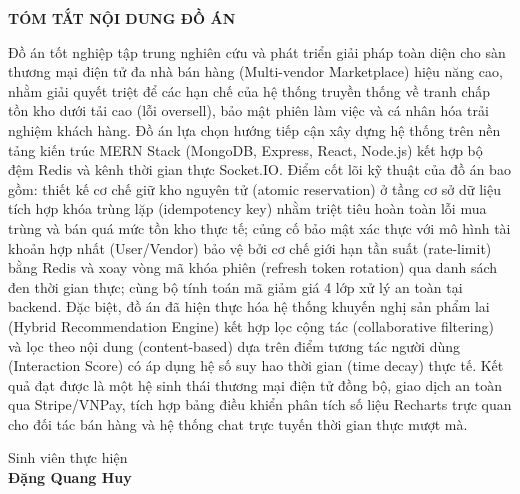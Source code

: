 \documentclass[../DoAn.tex]{subfiles}
\begin{document}
\begin{center}
    \Large{\textbf{TÓM TẮT NỘI DUNG ĐỒ ÁN}}\\
\end{center}
\vspace{1cm}

Đồ án tốt nghiệp tập trung nghiên cứu và phát triển giải pháp toàn diện cho sàn thương mại điện tử đa nhà bán hàng (Multi-vendor Marketplace) hiệu năng cao, nhằm giải quyết triệt để các hạn chế của hệ thống truyền thống về tranh chấp tồn kho dưới tải cao (lỗi oversell), bảo mật phiên làm việc và cá nhân hóa trải nghiệm khách hàng. Đồ án lựa chọn hướng tiếp cận xây dựng hệ thống trên nền tảng kiến trúc MERN Stack (MongoDB, Express, React, Node.js) kết hợp bộ đệm Redis và kênh thời gian thực Socket.IO. Điểm cốt lõi kỹ thuật của đồ án bao gồm: thiết kế cơ chế giữ kho nguyên tử (atomic reservation) ở tầng cơ sở dữ liệu tích hợp khóa trùng lặp (idempotency key) nhằm triệt tiêu hoàn toàn lỗi mua trùng và bán quá mức tồn kho thực tế; củng cố bảo mật xác thực với mô hình tài khoản hợp nhất (User/Vendor) bảo vệ bởi cơ chế giới hạn tần suất (rate-limit) bằng Redis và xoay vòng mã khóa phiên (refresh token rotation) qua danh sách đen thời gian thực; cùng bộ tính toán mã giảm giá 4 lớp xử lý an toàn tại backend. Đặc biệt, đồ án đã hiện thực hóa hệ thống khuyến nghị sản phẩm lai (Hybrid Recommendation Engine) kết hợp lọc cộng tác (collaborative filtering) và lọc theo nội dung (content-based) dựa trên điểm tương tác người dùng (Interaction Score) có áp dụng hệ số suy hao thời gian (time decay) thực tế. Kết quả đạt được là một hệ sinh thái thương mại điện tử đồng bộ, giao dịch an toàn qua Stripe/VNPay, tích hợp bảng điều khiển phân tích số liệu Recharts trực quan cho đối tác bán hàng và hệ thống chat trực tuyến thời gian thực mượt mà.

\begin{flushright}
Sinh viên thực hiện\\
\vspace{1.5cm}
\textbf{Đặng Quang Huy}
\end{flushright}
\end{document}
